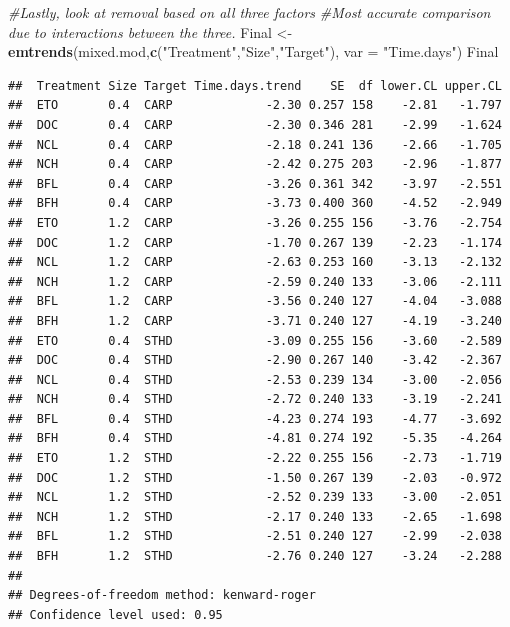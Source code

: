 \documentclass[
]{article}
\newenvironment{Shaded}{\begin{snugshade}}{\end{snugshade}}
\newcommand{\AttributeTok}[1]{\textcolor[rgb]{0.13,0.29,0.53}{#1}}
\newcommand{\CommentTok}[1]{\textcolor[rgb]{0.56,0.35,0.01}{\textit{#1}}}
\newcommand{\FunctionTok}[1]{\textcolor[rgb]{0.13,0.29,0.53}{\textbf{#1}}}
\newcommand{\NormalTok}[1]{#1}
\newcommand{\OtherTok}[1]{\textcolor[rgb]{0.56,0.35,0.01}{#1}}
\newcommand{\StringTok}[1]{\textcolor[rgb]{0.31,0.60,0.02}{#1}}
\begin{document}
\begin{Shaded}
\begin{Highlighting}[]
\CommentTok{\#Lastly, look at removal based on all three factors}
\CommentTok{\#Most accurate comparison due to interactions between the three. }
\NormalTok{Final }\OtherTok{\textless{}{-}} \FunctionTok{emtrends}\NormalTok{(mixed.mod,}\FunctionTok{c}\NormalTok{(}\StringTok{"Treatment"}\NormalTok{,}\StringTok{"Size"}\NormalTok{,}\StringTok{"Target"}\NormalTok{), }\AttributeTok{var =} \StringTok{"Time.days"}\NormalTok{)}
\NormalTok{Final}
\end{Highlighting}
\end{Shaded}

\begin{verbatim}
##  Treatment Size Target Time.days.trend    SE  df lower.CL upper.CL
##  ETO       0.4  CARP             -2.30 0.257 158    -2.81   -1.797
##  DOC       0.4  CARP             -2.30 0.346 281    -2.99   -1.624
##  NCL       0.4  CARP             -2.18 0.241 136    -2.66   -1.705
##  NCH       0.4  CARP             -2.42 0.275 203    -2.96   -1.877
##  BFL       0.4  CARP             -3.26 0.361 342    -3.97   -2.551
##  BFH       0.4  CARP             -3.73 0.400 360    -4.52   -2.949
##  ETO       1.2  CARP             -3.26 0.255 156    -3.76   -2.754
##  DOC       1.2  CARP             -1.70 0.267 139    -2.23   -1.174
##  NCL       1.2  CARP             -2.63 0.253 160    -3.13   -2.132
##  NCH       1.2  CARP             -2.59 0.240 133    -3.06   -2.111
##  BFL       1.2  CARP             -3.56 0.240 127    -4.04   -3.088
##  BFH       1.2  CARP             -3.71 0.240 127    -4.19   -3.240
##  ETO       0.4  STHD             -3.09 0.255 156    -3.60   -2.589
##  DOC       0.4  STHD             -2.90 0.267 140    -3.42   -2.367
##  NCL       0.4  STHD             -2.53 0.239 134    -3.00   -2.056
##  NCH       0.4  STHD             -2.72 0.240 133    -3.19   -2.241
##  BFL       0.4  STHD             -4.23 0.274 193    -4.77   -3.692
##  BFH       0.4  STHD             -4.81 0.274 192    -5.35   -4.264
##  ETO       1.2  STHD             -2.22 0.255 156    -2.73   -1.719
##  DOC       1.2  STHD             -1.50 0.267 139    -2.03   -0.972
##  NCL       1.2  STHD             -2.52 0.239 133    -3.00   -2.051
##  NCH       1.2  STHD             -2.17 0.240 133    -2.65   -1.698
##  BFL       1.2  STHD             -2.51 0.240 127    -2.99   -2.038
##  BFH       1.2  STHD             -2.76 0.240 127    -3.24   -2.288
## 
## Degrees-of-freedom method: kenward-roger 
## Confidence level used: 0.95
\end{verbatim}
\end{document}
